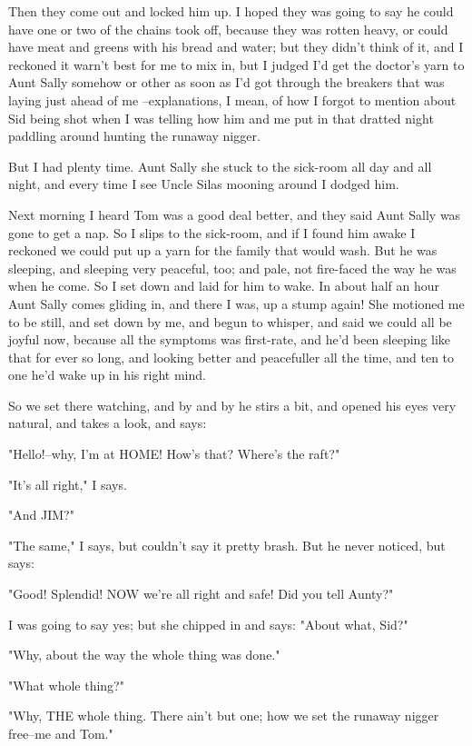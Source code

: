 Then they come out and locked him up.  I hoped they was going to say he
could have one or two of the chains took off, because they was rotten
heavy, or could have meat and greens with his bread and water; but they
didn't think of it, and I reckoned it warn't best for me to mix in, but I
judged I'd get the doctor's yarn to Aunt Sally somehow or other as soon
as I'd got through the breakers that was laying just ahead of me
--explanations, I mean, of how I forgot to mention about Sid being shot
when I was telling how him and me put in that dratted night paddling
around hunting the runaway nigger.

But I had plenty time.  Aunt Sally she stuck to the sick-room all day and
all night, and every time I see Uncle Silas mooning around I dodged him.

Next morning I heard Tom was a good deal better, and they said Aunt Sally
was gone to get a nap.  So I slips to the sick-room, and if I found him
awake I reckoned we could put up a yarn for the family that would wash.
But he was sleeping, and sleeping very peaceful, too; and pale, not
fire-faced the way he was when he come.  So I set down and laid for him
to wake.  In about half an hour Aunt Sally comes gliding in, and there I
was, up a stump again!  She motioned me to be still, and set down by me,
and begun to whisper, and said we could all be joyful now, because all
the symptoms was first-rate, and he'd been sleeping like that for ever so
long, and looking better and peacefuller all the time, and ten to one
he'd wake up in his right mind.

So we set there watching, and by and by he stirs a bit, and opened his
eyes very natural, and takes a look, and says:

"Hello!--why, I'm at HOME!  How's that?  Where's the raft?"

"It's all right," I says.

"And JIM?"

"The same," I says, but couldn't say it pretty brash.  But he never
noticed, but says:

"Good!  Splendid!  NOW we're all right and safe! Did you tell Aunty?"

I was going to say yes; but she chipped in and says:  "About what, Sid?"

"Why, about the way the whole thing was done."

"What whole thing?"

"Why, THE whole thing.  There ain't but one; how we set the runaway
nigger free--me and Tom."

